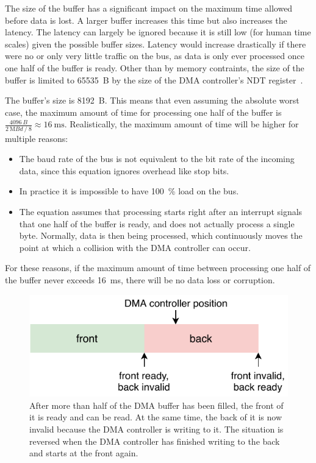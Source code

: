 The size of the buffer has a significant impact on the maximum time allowed before data is lost. A
larger buffer increases this time but also increases the latency. The latency can largely be ignored
because it is still low (for human time scales) given the possible buffer sizes. Latency would
increase drastically if there were no or only very little traffic on the bus, as data is only ever
processed once one half of the buffer is ready. Other than by memory contraints, the size of the buffer
is limited to \SI{65535}{B} by the size of the DMA controller's NDT register~\cite{mcu-ref-manual}.

The buffer's size is \SI{8192}{B}. This means that even assuming the absolute worst case, the maximum
amount of time for processing one half of the buffer is
$\frac{\SI{4096}{B}}{\SI{2}{\mega{Bd}} \mathbin{/} 8} \approx \SI{16}{\milli\second}$. Realistically,
the maximum amount of time will be higher for multiple reasons:

\begin{itemize}
    \item The baud rate of the bus is not equivalent to the bit rate of the incoming data, since
          this equation ignores overhead like stop bits.
    \item In practice it is impossible to have \SI{100}{\percent} load on the bus.
    \item The equation assumes that processing starts right after an interrupt signals that one half
          of the buffer is ready, and does not actually process a single byte. Normally, data is
          then being processed, which continuously moves the point at which a collision with the DMA
          controller can occur.
\end{itemize}

For these reasons, if the maximum amount of time between processing one half of the buffer never
exceeds \SI{16}{\milli\second}, there will be no data loss or corruption.

\begin{figure}[h]
    \centering
    \includegraphics[scale=1.0]{img/dma_buffer.pdf}
    \caption[Layout of the DMA buffer]{
        After more than half of the DMA buffer has been filled, the front of it is ready and can be
        read. At the same time, the back of it is now invalid because the DMA controller is writing
        to it. The situation is reversed when the DMA controller has finished writing to the back
        and starts at the front again.
    }
\end{figure}

